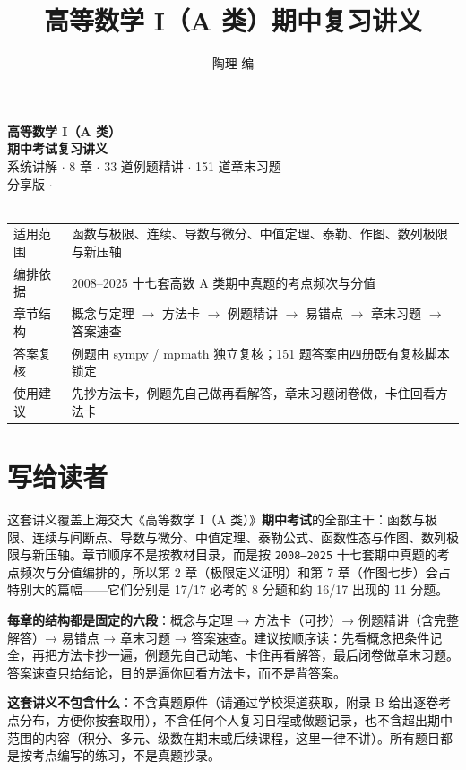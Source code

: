 \documentclass[11pt,a4paper]{ctexart}
\title{高等数学 I（A 类）期中复习讲义}
\author{陶理 编}
\makeatletter
\newcommand{\showdate}{\@date}
\makeatother
\begin{document}
\begin{center}
\vspace*{1.0cm}
{\Huge\bfseries\color{tlblue} 高等数学 I（A 类）}\\[6pt]
{\Huge\bfseries\color{tlblue} 期中考试复习讲义}\\[14pt]
{\Large 系统讲解 $\cdot$ 8 章 $\cdot$ 33 道例题精讲 $\cdot$ 151 道章末习题}\\[8pt]
{\large 分享版 $\cdot$ \showdate}\\[16pt]
\noindent{\color{tlrule}\rule{0.82\linewidth}{0.6pt}}\\[14pt]
\begin{tabular}{@{}ll@{}}
适用范围 & 函数与极限、连续、导数与微分、中值定理、泰勒、作图、数列极限与新压轴 \\
编排依据 & 2008--2025 十七套高数 A 类期中真题的考点频次与分值 \\
章节结构 & 概念与定理 $\to$ 方法卡 $\to$ 例题精讲 $\to$ 易错点 $\to$ 章末习题 $\to$ 答案速查 \\
答案复核 & 例题由 sympy / mpmath 独立复核；151 题答案由四册既有复核脚本锁定 \\
使用建议 & 先抄方法卡，例题先自己做再看解答，章末习题闭卷做，卡住回看方法卡 \\
\end{tabular}
\end{center}

\newpage
{}
\section*{写给读者}

\noindent 这套讲义覆盖上海交大《高等数学 I（A 类）》\textbf{期中考试}的全部主干：函数与极限、连续与间断点、导数与微分、中值定理、泰勒公式、函数性态与作图、数列极限与新压轴。章节顺序不是按教材目录，而是按 \texttt{2008--2025} 十七套期中真题的考点频次与分值编排的，所以第 2 章（极限定义证明）和第 7 章（作图七步）会占特别大的篇幅——它们分别是 17/17 必考的 8 分题和约 16/17 出现的 11 分题。

\bigskip
\noindent\textbf{每章的结构都是固定的六段}：概念与定理 → 方法卡（可抄）→ 例题精讲（含完整解答）→ 易错点 → 章末习题 → 答案速查。建议按顺序读：先看概念把条件记全，再把方法卡抄一遍，例题先自己动笔、卡住再看解答，最后闭卷做章末习题。答案速查只给结论，目的是逼你回看方法卡，而不是背答案。

\bigskip
\noindent\textbf{这套讲义不包含什么}：不含真题原件（请通过学校渠道获取，附录 B 给出逐卷考点分布，方便你按套取用），不含任何个人复习日程或做题记录，也不含超出期中范围的内容（积分、多元、级数在期末或后续课程，这里一律不讲）。所有题目都是按考点编写的练习，不是真题抄录。
\end{document}

